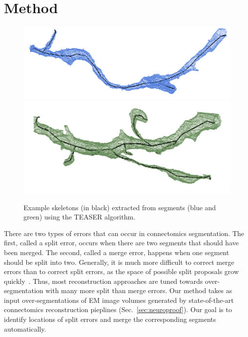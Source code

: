 \section{Method}

\begin{figure}[t]
	\centering
	\includegraphics[width=0.92\linewidth]{./figures/skeleton1.png}
	\includegraphics[width=0.92\linewidth]{./figures/skeleton2.png}
	\caption{Example skeletons (in black) extracted from segments (blue and green) using the TEASER algorithm.}
	\label{fig:skeletonization}
\end{figure}

There are two types of errors that can occur in connectomics segmentation.
The first, called a split error, occurs when there are two segments that should have been merged. The second, called a merge error, happens when one segment should be split into two. Generally, it is much more difficult to correct merge errors than to correct split errors,
as the space of possible split proposals grow quickly~\cite{parag2015properties}.
Thus, most reconstruction approaches are tuned towards over-segmentation with many more split than merge errors. Our method takes as input over-segmentations of EM image volumes generated by state-of-the-art connectomics reconstruction pieplines (Sec.~\ref{sec:neuroproof}). Our goal is to identify locations of split errors and merge the corresponding segments automatically.

